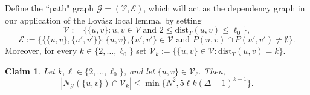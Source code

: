 \documentclass[11pt,leqno]{amsart}
\newtheorem{claim}[theorem]{Claim}
\theoremstyle{remark}
\theoremstyle{plain}
\begin{document}
Define the ``path" graph $\mathcal{G} = (\mathcal{V},\mathcal{E})$, which will act as the dependency graph in our application of the Lov\'{a}sz local lemma, by setting
\[ \mathcal{V}:=\big\{\{u,v\}\colon u,v\in V \text{ and } 2\leqslant\mathrm{dist}_T(u,v)\leqslant\ell_0\big\}, \]
\[ \mathcal{E}:=\Big\{ \big\{\{u,v\},\{u',v'\}\big\}\colon \{u,v\},\{u',v'\}\in \mathcal{V} \text{ and }
P(u,v)\cap P(u',v') \neq \emptyset\Big\}. \]
Moreover, for every $k\in \{2,\dots, \ell_0\}$ set
$\mathcal{V}_k:= \big\{ \{u,v\}\in\mathcal{V}\colon \mathrm{dist}_T(u,v)=k\big\}$.
\begin{claim} \label{cl:control_degree}
Let $k,\ell\in \{2,\dots,\ell_0\}$, and let $\{u,v\}\in\mathcal{V_\ell}$. Then,
\[ |N_\mathcal{G}(\{u,v\})\cap  \mathcal{V}_k|\leqslant \min\big\{N^2, 5\ell k (\Delta-1)^{k-1}\big\}. \]
\end{claim}
\end{document}
